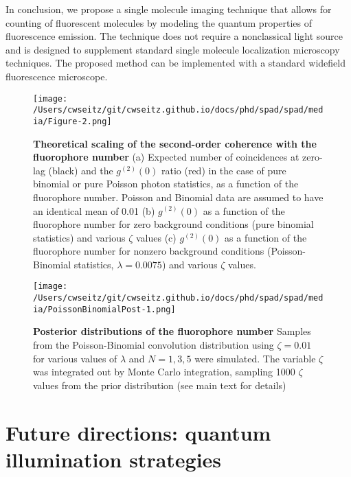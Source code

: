In conclusion, we propose a single molecule imaging technique that allows for counting of fluorescent molecules by modeling the quantum properties of fluorescence emission. The technique does not require a nonclassical light source and is designed to supplement standard single molecule localization microscopy techniques. The proposed method can be implemented with a standard widefield fluorescence microscope.

\clearpage
\begin{figure}
\centering
\texttt{[image: /Users/cwseitz/git/cwseitz.github.io/docs/phd/spad/spad/media/Figure-2.png]}
\caption{\textbf{Theoretical scaling of the second-order coherence with the fluorophore number} (a) Expected number of coincidences at zero-lag (black) and the $g^{(2)}(0)$ ratio (red) in the case of pure binomial or pure Poisson photon statistics, as a function of the fluorophore number. Poisson and Binomial data are assumed to have an identical mean of 0.01 (b) $g^{(2)}(0)$ as a function of the fluorophore number for zero background conditions (pure binomial statistics) and various $\zeta$ values (c) $g^{(2)}(0)$ as a function of the fluorophore number for nonzero background conditions (Poisson-Binomial statistics, $\lambda=0.0075$) and various $\zeta$ values.}
\label{fig:binomvpoiss}
\end{figure}  


\begin{figure*}
\centering
\texttt{[image: /Users/cwseitz/git/cwseitz.github.io/docs/phd/spad/spad/media/PoissonBinomialPost-1.png]}
\caption{\textbf{Posterior distributions of the fluorophore number} Samples from the Poisson-Binomial convolution distribution using $\zeta=0.01$ for various values of $\lambda$ and $N=1,3,5$ were simulated. The variable $\zeta$ was integrated out by Monte Carlo integration, sampling 1000 $\zeta$ values from the prior distribution (see main text for details)}
\label{fig:fig9}
\end{figure*}    

\clearpage
\section{Future directions: quantum illumination strategies}


